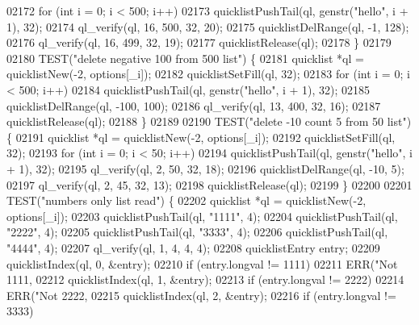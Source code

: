 \begin{DoxyCode}
{{{{{{{{{{{{{{{{{{{{{{{{{{{{{{{{{{{{{{{{{{{{{{{{{{{{{{{{{{{{{{{{{{{{{{02172             \textcolor{keywordflow}{for} (\textcolor{keywordtype}{int} i = 0; i < 500; i++)
02173                 quicklistPushTail(ql, genstr(\textcolor{stringliteral}{"hello"}, i + 1), 32);
02174             ql\_verify(ql, 16, 500, 32, 20);
02175             quicklistDelRange(ql, -1, 128);
02176             ql\_verify(ql, 16, 499, 32, 19);
02177             quicklistRelease(ql);
02178         \}
02179 
02180         TEST(\textcolor{stringliteral}{"delete negative 100 from 500 list"}) \{
02181             quicklist *ql = quicklistNew(-2, options[\_i]);
02182             quicklistSetFill(ql, 32);
02183             \textcolor{keywordflow}{for} (\textcolor{keywordtype}{int} i = 0; i < 500; i++)
02184                 quicklistPushTail(ql, genstr(\textcolor{stringliteral}{"hello"}, i + 1), 32);
02185             quicklistDelRange(ql, -100, 100);
02186             ql\_verify(ql, 13, 400, 32, 16);
02187             quicklistRelease(ql);
02188         \}
02189 
02190         TEST(\textcolor{stringliteral}{"delete -10 count 5 from 50 list"}) \{
02191             quicklist *ql = quicklistNew(-2, options[\_i]);
02192             quicklistSetFill(ql, 32);
02193             \textcolor{keywordflow}{for} (\textcolor{keywordtype}{int} i = 0; i < 50; i++)
02194                 quicklistPushTail(ql, genstr(\textcolor{stringliteral}{"hello"}, i + 1), 32);
02195             ql\_verify(ql, 2, 50, 32, 18);
02196             quicklistDelRange(ql, -10, 5);
02197             ql\_verify(ql, 2, 45, 32, 13);
02198             quicklistRelease(ql);
02199         \}
02200 
02201         TEST(\textcolor{stringliteral}{"numbers only list read"}) \{
02202             quicklist *ql = quicklistNew(-2, options[\_i]);
02203             quicklistPushTail(ql, \textcolor{stringliteral}{"1111"}, 4);
02204             quicklistPushTail(ql, \textcolor{stringliteral}{"2222"}, 4);
02205             quicklistPushTail(ql, \textcolor{stringliteral}{"3333"}, 4);
02206             quicklistPushTail(ql, \textcolor{stringliteral}{"4444"}, 4);
02207             ql\_verify(ql, 1, 4, 4, 4);
02208             quicklistEntry entry;
02209             quicklistIndex(ql, 0, &entry);
02210             \textcolor{keywordflow}{if} (entry.longval != 1111)
02211                 ERR(\textcolor{stringliteral}{"Not 1111, %
02212             quicklistIndex(ql, 1, &entry);
02213             \textcolor{keywordflow}{if} (entry.longval != 2222)
02214                 ERR(\textcolor{stringliteral}{"Not 2222, %
02215             quicklistIndex(ql, 2, &entry);
02216             \textcolor{keywordflow}{if} (entry.longval != 3333)
}}}}}}}}}}}}}}}}}}}}}}}}}}}}}}}}}}}}}}}}}}}}}}}}}}}}}}}}}}}}}}}}}}}}}}}}
\end{DoxyCode}

